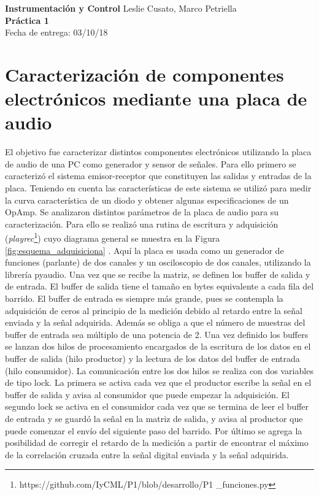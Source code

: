 \documentclass[a4paper, 11pt]{article}
\begin{document}
\noindent
\large\textbf{Instrumentación y Control} \hfill  Leslie Cusato, Marco Petriella\\
\textbf{Práctica 1}   \\
Fecha de entrega: 03/10/18 \\


\section*{Caracterización de componentes electrónicos mediante una placa de audio }
El objetivo fue caracterizar distintos componentes electrónicos utilizando la placa de audio de una PC como generador y sensor de señales. Para ello primero se caracterizó el sistema emisor-receptor que constituyen las salidas y entradas de la placa. Teniendo en cuenta las características de este sistema se utilizó para medir la curva característica de un diodo y obtener algunas especificaciones de un OpAmp.%
Se analizaron distintos parámetros de la placa de audio para su caracterización. Para ello se realizó una rutina de escritura y adquisición (\textit{playrec}\footnote{https://github.com/IyCML/P1/blob/desarrollo/P1 \_funciones.py}) cuyo diagrama general se muestra en la Figura \ref{fig:esquema_adquisiciona} . Aquí la placa es usada como un generador de funciones (parlante) de dos canales y un osciloscopio de dos canales, utilizando la librería pyaudio. 
Una vez que se recibe la matriz, se definen los buffer de salida y de entrada. El buffer de salida tiene el tamaño en bytes equivalente a cada fila del barrido. El buffer de entrada es siempre más grande, pues se contempla la adquisición de ceros al principio de la medición debido al retardo entre la señal enviada y la señal adquirida. Además se obliga a que el número de muestras del buffer de entrada sea múltiplo de una potencia de 2.
Una vez definido los buffers se lanzan dos hilos de procesamiento encargados de la escritura de los datos en el buffer de salida (hilo productor) y la lectura de los datos del buffer de entrada (hilo consumidor). La comunicación entre los dos hilos se realiza con dos variables de tipo lock. La primera se activa cada vez que el productor escribe la señal en el buffer de salida y avisa al consumidor que puede empezar la adquisición. El segundo lock se activa en el consumidor cada vez que se termina de leer el buffer de entrada y se guardó la señal en la matriz de salida, y avisa al productor que puede comenzar el envío del siguiente paso del barrido.
Por último se agrega la posibilidad de corregir el retardo de la medición a partir de encontrar el máximo de la correlación cruzada entre la señal digital enviada y la señal adquirida.
\end{document}
